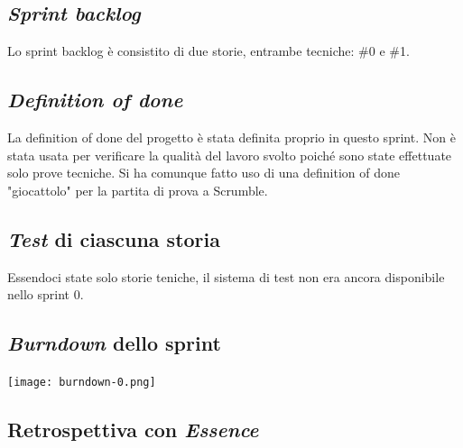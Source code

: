\documentclass{article}
\begin{document}
\subsection{\emph{Sprint backlog}}

Lo sprint backlog è consistito di due storie, entrambe tecniche: \#0 e \#1.

\subsection{\emph{Definition of done}}

La definition of done del progetto è stata definita proprio in questo sprint.
Non è stata usata per verificare la qualità del lavoro svolto poiché sono state
effettuate solo prove tecniche. Si ha comunque fatto uso di una definition of
done "giocattolo" per la partita di prova a Scrumble.

\subsection{\emph{Test} di ciascuna storia}

Essendoci state solo storie teniche, il sistema di test non era ancora
disponibile nello sprint 0.

\subsection{\emph{Burndown} dello sprint}

\texttt{[image: burndown-0.png]}

\subsection{Retrospettiva con \emph{Essence}}
\end{document}

